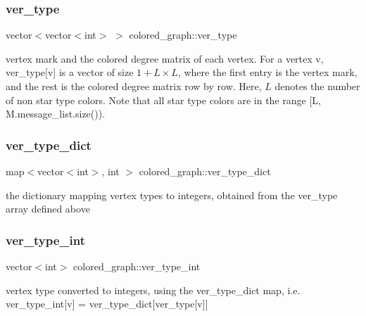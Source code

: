 \subsubsection{\texorpdfstring{ver\+\_\+type}{ver\_type}}
{\footnotesize\ttfamily vector$<$vector$<$int$>$ $>$ colored\+\_\+graph\+::ver\+\_\+type}



vertex mark and the colored degree matrix of each vertex. For a vertex v, ver\+\_\+type\mbox{[}v\mbox{]} is a vector of size $1 + L \times L$, where the first entry is the vertex mark, and the rest is the colored degree matrix row by row. Here, $L$ denotes the number of non star type colors. Note that all star type colors are in the range \mbox{[}L, M.\+message\+\_\+list.\+size()). 

\mbox{\label{classcolored__graph_aeb780762429ddac375799f4a45405712}} 
\subsubsection{\texorpdfstring{ver\+\_\+type\+\_\+dict}{ver\_type\_dict}}
{\footnotesize\ttfamily map$<$vector$<$int$>$, int $>$ colored\+\_\+graph\+::ver\+\_\+type\+\_\+dict}



the dictionary mapping vertex types to integers, obtained from the ver\+\_\+type array defined above 

\mbox{\label{classcolored__graph_a491ed2ea1a65118af02ec606c8d44c0a}} 
\subsubsection{\texorpdfstring{ver\+\_\+type\+\_\+int}{ver\_type\_int}}
{\footnotesize\ttfamily vector$<$int$>$ colored\+\_\+graph\+::ver\+\_\+type\+\_\+int}



vertex type converted to integers, using the ver\+\_\+type\+\_\+dict map, i.\+e. ver\+\_\+type\+\_\+int\mbox{[}v\mbox{]} = ver\+\_\+type\+\_\+dict\mbox{[}ver\+\_\+type\mbox{[}v\mbox{]}\mbox{]} 

